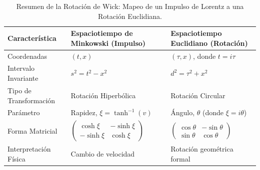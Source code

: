 \documentclass[11pt,a4paper]{book}
\begin{document}
\begin{table}[h!]
\centering
\caption{Resumen de la Rotación de Wick: Mapeo de un Impulso de Lorentz a una Rotación Euclidiana.}
\label{tab:wick}
\begin{tabular}{l|l|l}
\hline
\textbf{Característica} & \textbf{Espaciotiempo de Minkowski (Impulso)} & \textbf{Espaciotiempo Euclidiano (Rotación)} \\
\hline \hline
Coordenadas & $(t, x)$ & $(\tau, x)$, donde $t = i\tau$ \\
\hline
Intervalo Invariante & $s^2 = t^2 - x^2$ & $d^2 = \tau^2 + x^2$ \\
\hline
Tipo de Transformación & Rotación Hiperbólica & Rotación Circular \\
\hline
Parámetro & Rapidez, $\xi = \tanh^{-1}(v)$ & Ángulo, $\theta$ (donde $\xi = i\theta$) \\
\hline
Forma Matricial & $\begin{pmatrix} \cosh\xi & -\sinh\xi \\ -\sinh\xi & \cosh\xi \end{pmatrix}$ & $\begin{pmatrix} \cos\theta & -\sin\theta \\ \sin\theta & \cos\theta \end{pmatrix}$ \\
\hline
Interpretación Física & Cambio de velocidad & Rotación geométrica formal \\
\hline
\end{tabular}
\end{table}
\end{document}
